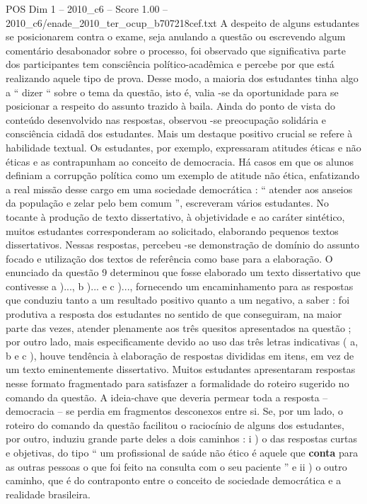 \begin{textsample}{POS Dim 1 – 2010\_c6 – Score 1.00 – 2010\_c6/enade\_2010\_ter\_ocup\_b707218cef.txt}
A despeito de alguns estudantes se posicionarem contra o exame, seja anulando a questão ou escrevendo algum comentário desabonador sobre o processo, foi observado que significativa parte dos participantes tem consciência político-acadêmica e percebe por que está realizando aquele tipo de prova.
Desse modo, a maioria dos estudantes tinha algo a “ dizer “ sobre o tema da questão, isto é, valia -se da oportunidade para se posicionar a respeito do assunto trazido à baila.
Ainda do ponto de vista do conteúdo desenvolvido nas respostas, observou -se preocupação solidária e consciência cidadã dos estudantes.
Mais um destaque positivo crucial se refere à habilidade textual.
Os estudantes, por exemplo, expressaram atitudes éticas e não éticas e as contrapunham ao conceito de democracia.
Há casos em que os alunos definiam a corrupção política como um exemplo de atitude não ética, enfatizando a real missão desse cargo em uma sociedade democrática : “ atender aos anseios da população e zelar pelo bem comum ”, escreveram vários estudantes.
No tocante à produção de texto dissertativo, à objetividade e ao caráter sintético, muitos estudantes corresponderam ao solicitado, elaborando pequenos textos dissertativos.
Nessas respostas, percebeu -se demonstração de domínio do assunto focado e utilização dos textos de referência como base para a elaboração.
O enunciado da questão 9 determinou que fosse elaborado um texto dissertativo que contivesse a )..., b )... e c )..., fornecendo um encaminhamento para as respostas que conduziu tanto a um resultado positivo quanto a um negativo, a saber : foi produtiva a resposta dos estudantes no sentido de que conseguiram, na maior parte das vezes, atender plenamente aos três quesitos apresentados na questão ; por outro lado, mais especificamente devido ao uso das três letras indicativas ( a, b e c ), houve tendência à elaboração de respostas divididas em itens, em vez de um texto eminentemente dissertativo.
Muitos estudantes apresentaram respostas nesse formato fragmentado para satisfazer a formalidade do roteiro sugerido no comando da questão.
A ideia-chave que deveria permear toda a resposta – democracia – se perdia em fragmentos desconexos entre si.
Se, por um lado, o roteiro do comando da questão facilitou o raciocínio de alguns dos estudantes, por outro, induziu grande parte deles a dois caminhos : i ) o das respostas curtas e objetivas, do tipo “ um profissional de saúde não ético é aquele que \textbf{conta} para as outras pessoas o que foi feito na consulta com o seu paciente ” e ii ) o outro caminho, que é do contraponto entre o conceito de sociedade democrática e a realidade brasileira.

\end{textsample}

